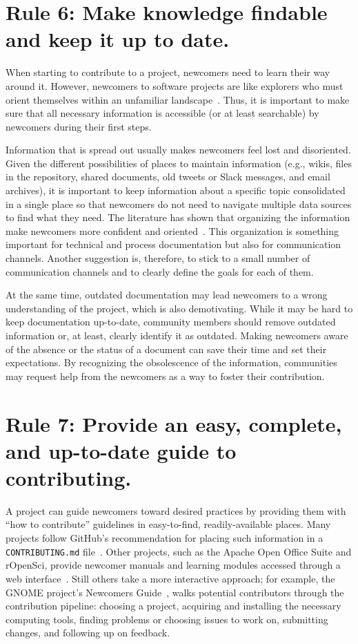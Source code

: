 \documentclass[10pt,letterpaper]{article}
\newcommand{\rulemajor}[1]{\section*{#1}}
\begin{document}
\rulemajor{Rule 6: Make knowledge findable and keep it up to date.}

When starting to contribute to a project,
newcomers need to learn their way around it.
However,
newcomers to software projects are like explorers who must orient themselves within an unfamiliar landscape~\cite{dagenais2010}.
Thus,
it is important to make sure that all necessary information is accessible
(or at least searchable)
by newcomers during their first steps.

Information that is spread out usually makes newcomers feel lost and disoriented.
Given the different possibilities of places to maintain information
(e.g., wikis, files in the repository, shared documents, old tweets or Slack messages, and email archives),
it is important to keep information about a specific topic consolidated in a single place
so that newcomers do not need to navigate multiple data sources to find what they need.
The literature has shown that organizing the information make newcomers more confident and oriented~\cite{steinmacher2016}.
This organization is something important for technical and process documentation but also for communication channels.
Another suggestion is, therefore, to stick to a small number of communication channels
and to clearly define the goals for each of them.

At the same time,
outdated documentation may lead newcomers to a wrong understanding of the project,
which is also demotivating.
While it may be hard to keep documentation up-to-date,
community members should remove outdated information or, at least, clearly identify it as outdated.
Making newcomers aware of the absence or the status of a document can save their time and set their expectations.
By recognizing the obsolescence of the information,
communities may request help from the newcomers as a way to foster their contribution.

\rulemajor{Rule 7: Provide an easy, complete, and up-to-date guide to contributing.}

A project can guide newcomers toward desired practices
by providing them with ``how to contribute'' guidelines in easy-to-find, readily-available places.
Many projects follow GitHub's recommendation for placing such information in a \texttt{CONTRIBUTING.md} file~\cite{github-rec}.
Other projects,
such as the Apache Open Office Suite and rOpenSci,
provide newcomer manuals and learning modules accessed through a web interface~\cite{apache-guidelines,ropensci-guidelines}.
Still others take a more interactive approach;
for example,
the GNOME project's Newcomers Guide~\cite{gnome-newcomers}, walks potential contributors through the contribution pipeline:
choosing a project,
acquiring and installing the necessary computing tools,
finding problems or choosing issues to work on,
submitting changes,
and following up on feedback.
\end{document}
